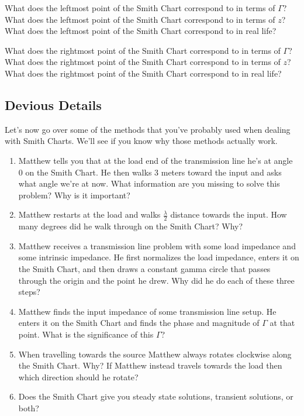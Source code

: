 \documentclass{article}
\begin{document}
What does the leftmost point of the Smith Chart correspond to in terms of $\Gamma$? What does the leftmost point of the Smith Chart correspond to in terms of $z$? What does the leftmost point of the Smith Chart correspond to in real life?

What does the rightmost point of the Smith Chart correspond to in terms of $\Gamma$? What does the rightmost point of the Smith Chart correspond to in terms of $z$? What does the rightmost point of the Smith Chart correspond to in real life?

\newpage

\subsection{Devious Details}

Let's now go over some of the methods that you've probably used when dealing with Smith Charts. We'll see if you know why those methods actually work.

\begin{enumerate}
    \item Matthew tells you that at the load end of the transmission line he's at angle 0 on the Smith Chart. He then walks 3 meters toward the input and asks what angle we're at now. What information are you missing to solve this problem? Why is it important?
    \item Matthew restarts at the load and walks $\frac{\lambda}{2}$ distance towards the input. How many degrees did he walk through on the Smith Chart? Why?
    \item Matthew receives a transmission line problem with some load impedance and some intrinsic impedance. He first normalizes the load impedance, enters it on the Smith Chart, and then draws a constant gamma circle that passes through the origin and the point he drew. Why did he do each of these three steps?
    \item Matthew finds the input impedance of some transmission line setup. He enters it on the Smith Chart and finds the phase and magnitude of $\Gamma$ at that point. What is the significance of this $\Gamma$?
    \item When travelling towards the source Matthew always rotates clockwise along the Smith Chart. Why? If Matthew instead travels towards the load then which direction should he rotate?
    \item Does the Smith Chart give you steady state solutions, transient solutions, or both?
\end{enumerate}
\end{document}
